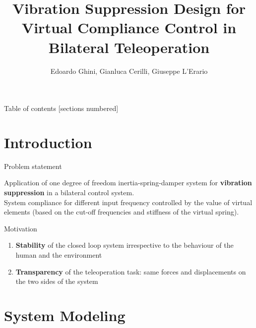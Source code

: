 \documentclass[10pt]{beamer}
\title{Vibration Suppression Design for Virtual Compliance Control in Bilateral Teleoperation}
\date{}
\author{Edoardo Ghini, Gianluca Cerilli, Giuseppe L'Erario}
\institute{La Sapienza University}
\begin{document}
	
	\maketitle
	
	\begin{frame}{Table of contents}
	[sections numbered]
	\tableofcontents[hideallsubsections]
\end{frame}

\section{Introduction}

\begin{frame}[fragile]{Problem statement}

Application of one degree of freedom inertia-spring-damper system for \textbf{vibration suppression} in a bilateral control system.\\
\bigskip
System compliance for different input frequency controlled by the
value of virtual elements (based on the cut-off frequencies and stiffness of the virtual spring).

\end{frame}
\begin{frame}[fragile]{Motivation}

\begin{enumerate}
\item \textbf{Stability} of the closed loop system irrespective to the behaviour of the human and the environment
\bigskip
\item \textbf{Transparency} of the teleoperation task: same forces and displacements on the two sides of the system \end{enumerate}

\end{frame}

\section{System Modeling}
\end{document}
